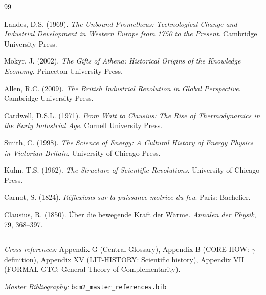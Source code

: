 \begin{thebibliography}{99}

 Landes, D.S. (1969). \textit{The Unbound Prometheus: Technological Change and Industrial Development in Western Europe from 1750 to the Present}. Cambridge University Press.

 Mokyr, J. (2002). \textit{The Gifts of Athena: Historical Origins of the Knowledge Economy}. Princeton University Press.

 Allen, R.C. (2009). \textit{The British Industrial Revolution in Global Perspective}. Cambridge University Press.

 Cardwell, D.S.L. (1971). \textit{From Watt to Clausius: The Rise of Thermodynamics in the Early Industrial Age}. Cornell University Press.

 Smith, C. (1998). \textit{The Science of Energy: A Cultural History of Energy Physics in Victorian Britain}. University of Chicago Press.

 Kuhn, T.S. (1962). \textit{The Structure of Scientific Revolutions}. University of Chicago Press.

 Carnot, S. (1824). \textit{Réflexions sur la puissance motrice du feu}. Paris: Bachelier.

 Clausius, R. (1850). Über die bewegende Kraft der Wärme. \textit{Annalen der Physik}, 79, 368--397.

\end{thebibliography}

\nocite{bcm_master}



\vspace{1em}
\hrule
\vspace{0.5em}

\noindent\textit{Cross-references:}
Appendix G (Central Glossary),
Appendix B (CORE-HOW: $\gamma$ definition),
Appendix XV (LIT-HISTORY: Scientific history),
Appendix VII (FORMAL-GTC: General Theory of Complementarity).

\noindent\textit{Master Bibliography:} \texttt{bcm2\_master\_references.bib}

